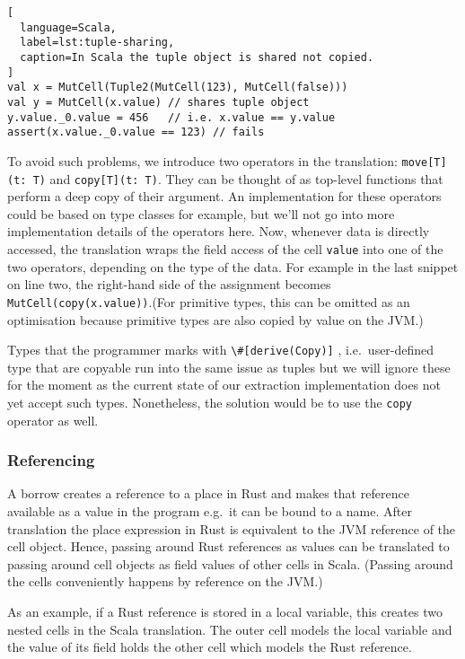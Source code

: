 \begin{lstlisting}[
  language=Scala,
  label=lst:tuple-sharing,
  caption=In Scala the tuple object is shared not copied.
]
val x = MutCell(Tuple2(MutCell(123), MutCell(false)))
val y = MutCell(x.value) // shares tuple object
y.value._0.value = 456   // i.e. x.value == y.value
assert(x.value._0.value == 123) // fails
\end{lstlisting}

To avoid such problems, we introduce two operators in the translation:
\passthrough{\lstinline!move[T](t: T)!} and
\passthrough{\lstinline!copy[T](t: T)!}. They can be thought of as
top-level functions that perform a deep copy of their argument. An
implementation for these operators could be based on type classes for
example, but we'll not go into more implementation details of the
operators here. Now, whenever data is directly accessed, the translation
wraps the field access of the cell \passthrough{\lstinline!value!} into
one of the two operators, depending on the type of the data. For example
in the last snippet on line two, the right-hand side of the assignment
becomes \lstinline!MutCell(copy(x.value))!.(For primitive
types, this can be omitted as an optimisation because primitive types
are also copied by value on the JVM.)

Types that the programmer marks with
\passthrough{\lstinline!\#[derive(Copy)]!} , i.e.~user-defined type that
are copyable run into the same issue as tuples but we will ignore these
for the moment as the current state of our extraction implementation
does not yet accept such types. Nonetheless, the solution would be to
use the \passthrough{\lstinline!copy!} operator as well.

\subsubsection{Referencing}

A borrow creates a reference to a place in Rust and makes that reference
available as a value in the program e.g.~it can be bound to a name.
After translation the place expression in Rust is equivalent to the JVM
reference of the cell object. Hence, passing around Rust references as
values can be translated to passing around cell objects as field values
of other cells in Scala. (Passing around the cells conveniently happens
by reference on the JVM.)

As an example, if a Rust reference is stored in a local variable, this
creates two nested cells in the Scala translation. The outer cell models
the local variable and the value of its field holds the other cell which
models the Rust reference.

